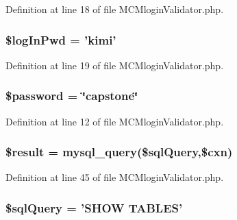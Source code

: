 Definition at line 18 of file M\-C\-Mlogin\-Validator.\-php.

\hypertarget{_m_c_mlogin_validator_8php_a1c091e7fa854daecefe6889e0cb8975e}{
\subsubsection[{\$log\-In\-Pwd}]{\setlength{\rightskip}{0pt plus 5cm}\$log\-In\-Pwd = 'kimi'}}\label{_m_c_mlogin_validator_8php_a1c091e7fa854daecefe6889e0cb8975e}


Definition at line 19 of file M\-C\-Mlogin\-Validator.\-php.

\hypertarget{_m_c_mlogin_validator_8php_a607686ef9f99ea7c42f4f3dd3dbb2b0d}{
\subsubsection[{\$password}]{\setlength{\rightskip}{0pt plus 5cm}\$password = \char`\"{}capstone\char`\"{}}}\label{_m_c_mlogin_validator_8php_a607686ef9f99ea7c42f4f3dd3dbb2b0d}


Definition at line 12 of file M\-C\-Mlogin\-Validator.\-php.

\hypertarget{_m_c_mlogin_validator_8php_a112ef069ddc0454086e3d1e6d8d55d07}{
\subsubsection[{\$result}]{\setlength{\rightskip}{0pt plus 5cm}\$result = mysql\-\_\-query(\$sql\-Query,\$cxn)}}\label{_m_c_mlogin_validator_8php_a112ef069ddc0454086e3d1e6d8d55d07}


Definition at line 45 of file M\-C\-Mlogin\-Validator.\-php.

\hypertarget{_m_c_mlogin_validator_8php_a08f961a26ebf8ad5411239bba701a67c}{
\subsubsection[{\$sql\-Query}]{\setlength{\rightskip}{0pt plus 5cm}\$sql\-Query = 'S\-H\-O\-W T\-A\-B\-L\-E\-S'}}\label{_m_c_mlogin_validator_8php_a08f961a26ebf8ad5411239bba701a67c}



